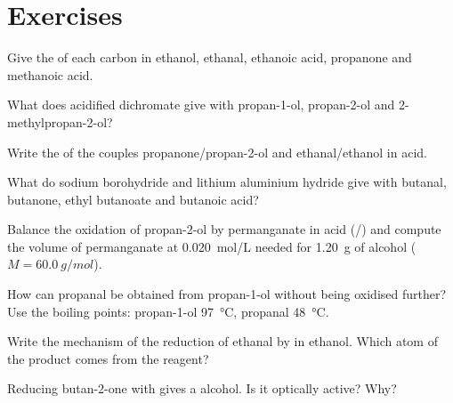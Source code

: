 \section{Exercises}

\begin{exercise}[$\star$]\label{exo:b1:organic-redox:1}
Give the  of each carbon in ethanol, ethanal, ethanoic
acid, propanone and methanoic acid.
\end{exercise}

\begin{exercise}[$\star$]\label{exo:b1:organic-redox:2}
What does acidified dichromate give with propan-1-ol, propan-2-ol and
2-methylpropan-2-ol?
\end{exercise}

\begin{exercise}[$\star$]\label{exo:b1:organic-redox:3}
Write the  of the couples propanone/propan-2-ol and
ethanal/ethanol in acid.
\end{exercise}

\begin{exercise}[$\star$]\label{exo:b1:organic-redox:4}
What do sodium borohydride and lithium aluminium hydride give with
butanal, butanone, ethyl butanoate and butanoic acid?
\end{exercise}

\begin{exercise}[$\star\star$]\label{exo:b1:organic-redox:5}
Balance the oxidation of propan-2-ol by permanganate in acid
(/) and compute the volume of permanganate at
\qty{0.020}{mol/L} needed for \qty{1.20}{g} of alcohol ($M = \qty{60.0}{g/mol}$).
\end{exercise}

\begin{exercise}[$\star\star$]\label{exo:b1:organic-redox:6}
How can propanal be obtained from propan-1-ol without being oxidised
further? Use the boiling points: propan-1-ol \qty{97}{\celsius}, propanal
\qty{48}{\celsius}.
\end{exercise}

\begin{exercise}[$\star\star$]\label{exo:b1:organic-redox:7}
Write the mechanism of the reduction of ethanal by  in ethanol.
Which atom of the product comes from the reagent?
\end{exercise}

\begin{exercise}[$\star\star$]\label{exo:b1:organic-redox:8}
Reducing butan-2-one with  gives a  alcohol. Is it
optically active? Why?
\end{exercise}

